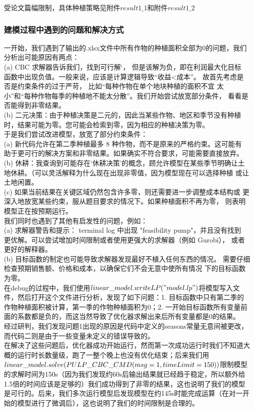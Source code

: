 \documentclass{cumcmthesis}
\begin{document}
受论文篇幅限制，具体种植策略见附件$result1\_1$和附件$result1\_2$

\subsubsection{建模过程中遇到的问题和解决方式}
一开始，我们遇到了输出的.xlsx文件中所有作物的种植面积全部为0的问题，我们分析出可能原因有两点：\\
(a) CBC 求解器告诉我们，找到可行解‘， 但是该解为负，即在利润最大化目标
函数中出现负值。一般来说，应该是计算逻辑导致“收益<成本”。 故首先考虑是否是约束条件的过于严苛， 比如“每种作物在单个地块种植的面积不宜
太小”和“每种作物每季的种植地不能太分散”。我们开始尝试放宽部分条件，
看看是否能得到非零结果。\\
(b) 二元决策：由于种植决策是二元的，因此当某些作物、地区和季节没有种植
时，结果可能为零。您可能会检索到零，因为相应的种植决策为零。\\

于是我们尝试改进模型，放宽了部分约束条件：\\
(a) 新代码允许在第二季种植最多 8 种作物，而不是原来的严格约束。这可能有
助于更可行的解决方案和非零结果。如果确实不符合要求，可能需要直接放弃。 \\
(b) 休耕：我查询到可能存在‘休耕决策’的概念，顾允许模型在某些季节明确让土
地休耕。（可以灵活解释为什么现在出现非零值，因为模型现在可以选择种植
或让土地闲置。 \\
(c) 如果当前结果在关键区域仍然包含许多零，则还需要进一步调整成本结构或
更深入地放宽某些约束，服从题目要求的情况下。如果种植面积不再为零，
则表明模型正在按预期运行。 \\

我们同时也遇到了其他有启发性的问题，例如：\\
(a) 求解器警告和提示： terminal log 中出现 "feasibility pump"，并且没有找到
更优解。可以尝试增加时间限制或者使用更强大的求解器（例如 Gurobi），
或者更好的解释器。 \\
(b) 目标函数的制定也可能导致求解器发现最好不植入任何东西的情况。
需要仔细检查预期销售额、价格和成本，以确保它们不会无意中使所有情况
下的目标函数为零。 \\

在debug的过程中，我们使用$ linear\_model.writeLP("model.lp") $将模型写入文件，然后打开这个文件进行分析，发现了如下问题：1. 目标函数中只有第二季的作物种植面积被计算，第一季的作物种植面积为0；2. 一开始目标函数所有变量前面的系数都是负的，而这当然导致了优化器求解出来后所有变量都是0的结果。\\
经过研判，我们发现问题1出现的原因是代码中定义的seasons常量无意间被更改，而代码二则是由于一些变量未定义的错误导致的。\\
在解决了这些问题后，优化器成功开始运行，然而第一次成功运行时我们不知道大概的运行时长数量级，跑了一整个晚上也没有优化结束；后来我们用 $ linear\_model.solve(PU\\LP\_CBC\_CMD(msg=1, timeLimit=150)) $限制模型的求解时间为150s（因为我们发现约60s后输出结果就已经趋于稳定，所以额外给1.5倍的时间应该是足够的）我们成功得到了非零的结果，这也说明了我们的模型是可行的。后来，我们多次运行模型后发现模型在约145s时能完成运算（在对一开始的模型进行了微调后），这也说明了我们的时间限制是合理的。
\end{document}
